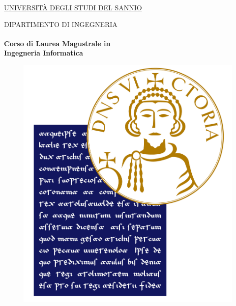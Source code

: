 \linespread{1} %

\thispagestyle{empty}
\large


\begin{center}
	\huge{{\underline{\textsc{UNIVERSIT\`A DEGLI STUDI DEL SANNIO}}}}
\end{center}

\begin{center}   
	\huge{{\textsc{DIPARTIMENTO DI INGEGNERIA}}}
	\\
	\LARGE{\textbf{\\Corso di Laurea Magustrale in \\Ingegneria Informatica}}      
	
\end{center}

\begin{figure}[h]
	\begin{center}
		\includegraphics[scale=0.3]{figure/logo/logoUniSannio_new.jpg}
	\end{center}
\end{figure}

